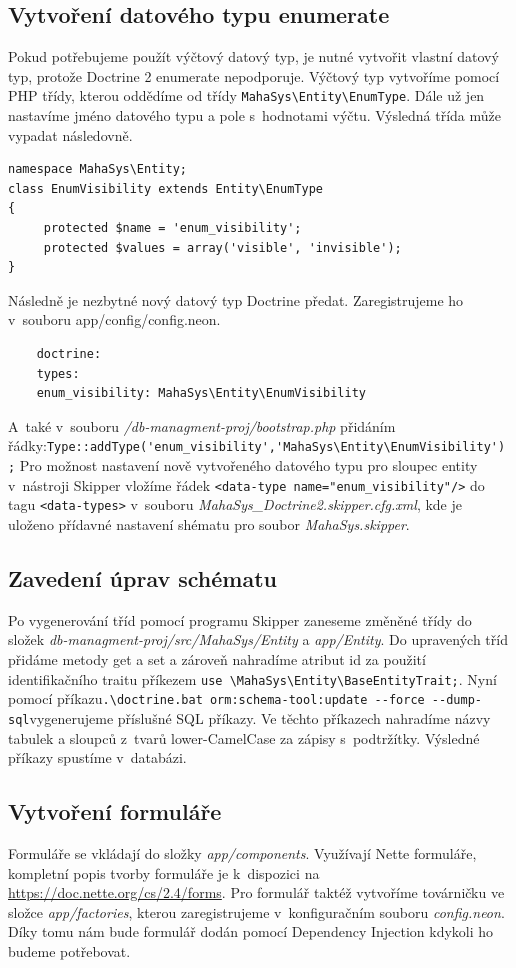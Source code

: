\documentclass[thesis=B,czech]{FITthesis}[2012/06/26]
\begin{document}
\subsection{Vytvoření datového typu enumerate}
	Pokud potřebujeme použít výčtový datový typ, je nutné vytvořit vlastní datový typ, protože Doctrine 2 enumerate nepodporuje. Výčtový typ vytvoříme pomocí PHP třídy, kterou oddědíme od třídy \verb|MahaSys\Entity\EnumType|. Dále už jen nastavíme jméno datového typu a pole s~hodnotami výčtu. Výsledná třída může vypadat následovně.
	\begin{verbatim}
namespace MahaSys\Entity;
class EnumVisibility extends Entity\EnumType
{
     protected $name = 'enum_visibility';
     protected $values = array('visible', 'invisible');
}
	\end{verbatim}
	Následně je nezbytné nový datový typ Doctrine předat. Zaregistrujeme ho v~souboru app/config/config.neon.
	\begin{verbatim}
	doctrine:
	types: 
	enum_visibility: MahaSys\Entity\EnumVisibility
	\end{verbatim}
	A~také v~souboru \emph{/db-managment-proj/bootstrap.php} přidáním řádky:\newline\verb|Type::addType('enum_visibility','MahaSys\Entity\EnumVisibility');|
Pro možnost nastavení nově vytvořeného datového typu pro sloupec entity v~nástroji Skipper vložíme řádek \verb|<data-type name="enum_visibility"/>| do tagu \verb|<data-types>| v~souboru \emph{MahaSys\_Doctrine2.skipper.cfg.xml}, kde je uloženo přídavné nastavení shématu pro soubor \emph{MahaSys.skipper}.
\subsection{Zavedení úprav schématu}
	Po vygenerování tříd pomocí programu Skipper zaneseme změněné třídy do složek \emph{db-managment-proj/src/MahaSys/Entity} a \emph{app/Entity}. Do upravených tříd přidáme metody get a set a zároveň nahradíme atribut id za použití identifikačního traitu příkezem \verb|use \MahaSys\Entity\BaseEntityTrait;|. Nyní pomocí příkazu\newline\verb|.\doctrine.bat orm:schema-tool:update --force --dump-sql|\newline vygenerujeme příslušné SQL příkazy. Ve těchto příkazech nahradíme názvy tabulek a sloupců z~tvarů lower-CamelCase za zápisy s~podtržítky. Výsledné příkazy spustíme v~databázi.
\subsection{Vytvoření formuláře}
	Formuláře se vkládají do složky \emph{app/components}. Využívají Nette formuláře, kompletní popis tvorby formuláře je k~dispozici na \url{https://doc.nette.org/cs/2.4/forms}. Pro formulář taktéž vytvoříme továrničku ve složce \emph{app/factories}, kterou zaregistrujeme v~konfiguračním souboru \emph{config.neon}. Díky tomu nám bude formulář dodán pomocí Dependency Injection kdykoli ho budeme potřebovat. 
\end{document}
